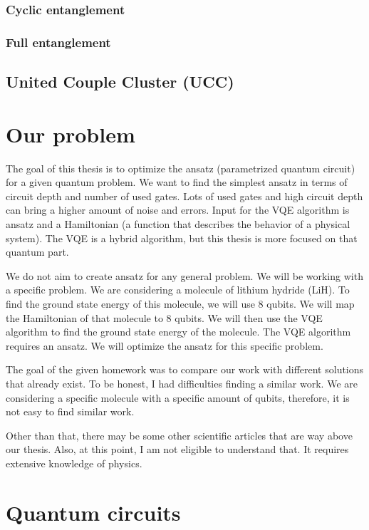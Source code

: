 \subsubsection{Cyclic entanglement}
\subsubsection{Full entanglement}
\subsection{United Couple Cluster (UCC)}

\section{Our problem}
The goal of this thesis is to optimize the ansatz (parametrized quantum circuit) for a given quantum problem. We want to find the simplest ansatz in terms of circuit depth and number of used gates. Lots of used gates and high circuit depth can bring a higher amount of noise and errors. Input for the VQE algorithm is ansatz and a Hamiltonian (a function that describes the behavior of a physical system). The VQE is a hybrid algorithm, but this thesis is more focused on that quantum part.

We do not aim to create ansatz for any general problem. We will be working with a specific problem. We are considering a molecule of lithium hydride (LiH). To find the ground state energy of this molecule, we will use 8 qubits. We will map the Hamiltonian of that molecule to 8 qubits. We will then use the VQE algorithm to find the ground state energy of the molecule. The VQE algorithm requires an ansatz. We will optimize the ansatz for this specific problem. 

The goal of the given homework was to compare our work with different solutions that already exist. To be honest, I had difficulties finding a similar work. We are considering a specific molecule with a specific amount of qubits, therefore, it is not easy to find similar work.


Other than that, there may be some other scientific articles that are way above our thesis. Also, at this point, I am not eligible to understand that. It requires extensive knowledge of physics.

\section{Quantum circuits}